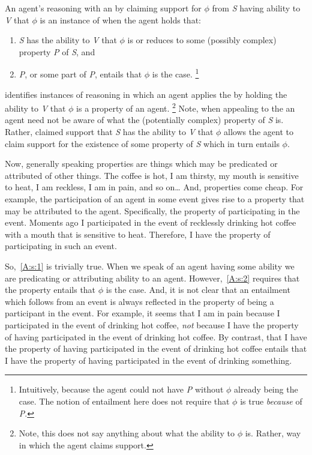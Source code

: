 \begin{note}
  \begin{definition}[\AR{}]\label{A:s}
    An agent's reasoning with an \aben{} by claiming support for \(\phi\) from \emph{S} having ability to \emph{V} that \(\phi\) is an instance of \emph{\AR{}} when the agent holds that:
    \begin{enumerate}[label=\textsf{A}\arabic*., ref=(\textsf{A}\arabic*)]
    \item\label{A:s:1} \emph{S} has the ability to \emph{V} that \(\phi\) is or reduces to some (possibly complex) property \emph{P} of \emph{S}, and
    \item\label{A:s:2} \emph{P}, or some part of \emph{P}, entails that \(\phi\) is the case.\nolinebreak
      \footnote{Intuitively, because the agent could not have \emph{P} without \(\phi\) already being the case.
      The notion of entailment here does not require that \(\phi\) is true \emph{because} of \emph{P}.}
    \end{enumerate}
  \end{definition}

  {
    \color{red}
    \AR{} identifies instances of reasoning in which an agent applies the \aben{} by holding the ability to \emph{V} that \(\phi\) is a property of an agent.\nolinebreak
    \footnote{
      Note, this does not say anything about what the ability to \(\phi\) is.
      Rather, way in which the agent claims support.
    }
    Note, when appealing to the \aben{} an agent need not be aware of what the (potentially complex) property of \emph{S} is.
    Rather, claimed support that \emph{S} has the ability to \emph{V} that \(\phi\) allows the agent to claim support for the existence of some property of \emph{S} which in turn entails \(\phi\).
  }

  Now, generally speaking properties are things which may be predicated or attributed of other things.
  The coffee is hot, I am thirsty, my mouth is sensitive to heat, I am reckless, I am in pain, and so on\dots
  And, properties come cheap.
  For example, the participation of an agent in some event gives rise to a property that may be attributed to the agent.
  Specifically, the property of participating in the event.
  Moments ago I participated in the event of recklessly drinking hot coffee with a mouth that is sensitive to heat.
  Therefore, I have the property of participating in such an event.

  So,~\ref{A:s:1} is trivially true.
  When we speak of an agent having some ability we are predicating or attributing ability to an agent.
  However,~\ref{A:s:2} requires that the property entails that \(\phi\) is the case.
  And, it is not clear that an entailment which follows from an event is always reflected in the property of being a participant in the event.
  For example, it seems that I am in pain because I participated in the event of drinking hot coffee, \emph{not} because I have the property of having participated in the event of drinking hot coffee.
  By contrast, that I have the property of having participated in the event of drinking hot coffee entails that I have the property of having participated in the event of drinking something.


\end{note}
